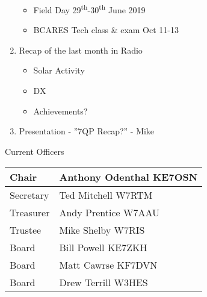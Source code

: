 \documentclass[letter,11pt]{extarticle}
\begin{document}
\begin{enumerate}
\begin{itemize}
				\item Field Day 29\textsuperscript{th}-30\textsuperscript{th} June 2019
				\item BCARES Tech class \& exam Oct 11-13
			\end{itemize}
		\item Recap of the last month in Radio
			\begin{itemize}
				\item Solar Activity
				\item DX
				\item Achievements?
			\end{itemize}
		\item  Presentation - ''7QP Recap?'' - Mike

	\end{enumerate}


	Current Officers \\
	\begin{tabular}{|l|l|} \hline
		Chair & Anthony Odenthal KE7OSN \\ \hline
		Secretary & Ted Mitchell W7RTM \\ \hline
		Treasurer & Andy Prentice W7AAU \\ \hline
		Trustee & Mike Shelby W7RIS   \\ \hline
		Board & Bill Powell KE7ZKH \\ \hline
		Board & Matt Cawrse KF7DVN \\ \hline
		Board & Drew Terrill W3HES\\ \hline
	\end{tabular}
	
	\subsection*{}
	
\end{document}
